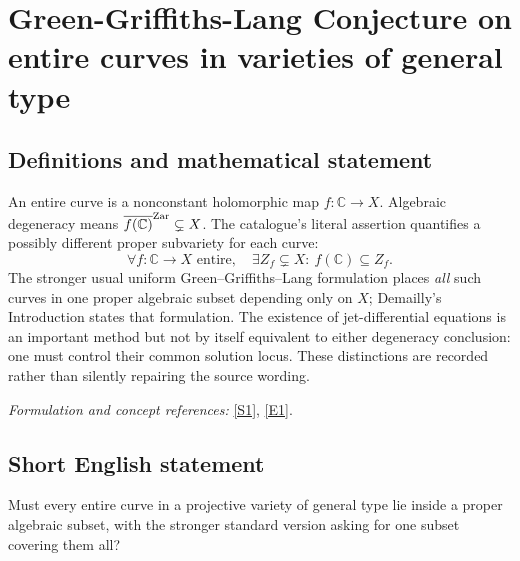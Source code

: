 \documentclass[11pt]{article}
\begin{document}
\section*{\texorpdfstring{Green-Griffiths-Lang Conjecture on entire curves in varieties of general type}{Green-Griffiths-Lang Conjecture on entire curves in varieties of general type}}\label{96}
\subsection{Definitions and mathematical statement}
An entire curve is a nonconstant holomorphic map $f:{\mathbb{C}}\to X$. Algebraic degeneracy means $\overline{f({\mathbb{C}})}^{\rm Zar}\subsetneq X$. The catalogue's literal assertion quantifies a possibly different proper subvariety for each curve:
\[
 \forall f:{\mathbb{C}}\to X\text{ entire},\quad\exists Z_f\subsetneq X:\ f({\mathbb{C}})\subseteq Z_f.
\]
The stronger usual uniform Green--Griffiths--Lang formulation places \emph{all} such curves in one proper algebraic subset depending only on $X$; Demailly's Introduction states that formulation. The existence of jet-differential equations is an important method but not by itself equivalent to either degeneracy conclusion: one must control their common solution locus. These distinctions are recorded rather than silently repairing the source wording.
\par\smallskip\textit{Formulation and concept references:} \href{https://arxiv.org/abs/1011.3636}{[S1]}, \href{https://arxiv.org/html/1011.3636v2}{[E1]}.

\subsection{Short English statement}
Must every entire curve in a projective variety of general type lie inside a proper algebraic subset, with the stronger standard version asking for one subset covering them all?
\end{document}
